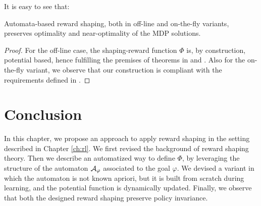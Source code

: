 \begin{example}
\end{example}

\medskip
It is easy to see that:

\begin{theorem}
	Automata-based reward shaping, both in off-line and on-the-fly variants, preserves optimality and near-optimality of the MDP solutions.
\end{theorem}
\begin{proof} For the off-line case, the shaping-reward function $\Phi$ is, by construction, potential based, hence fulfilling the premises of theorems in \citep{Ng:1999:PIU:645528.657613} and \citep{Grzes:2017:RSE:3091125.3091208}.
	Also for the on-the-fly variant, we observe that our construction is compliant with the requirements defined in \citep{Devlin:2012:DPR:2343576.2343638}.
\end{proof}


\section{Conclusion}
In this chapter, we propose an approach to apply reward shaping in the setting described in Chapter \ref{ch:rl}. We first revised the background of reward shaping theory. Then we describe an automatized way to define $\Phi$, by leveraging the structure of the automaton $\mathcal{A}_{\varphi}$ associated to the \LLf goal $\varphi$. We devised a variant in which the automaton is not known apriori, but it is built from scratch during learning, and the potential function is dynamically updated. Finally, we observe that both the designed reward shaping preserve policy invariance.